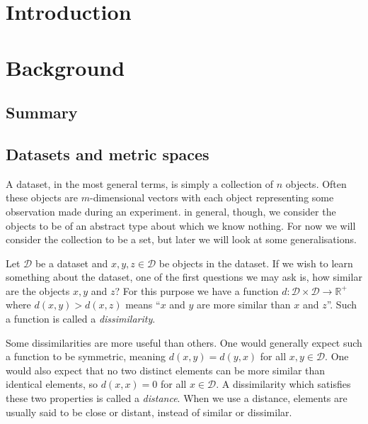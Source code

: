 \documentclass[a4paper]{report}
\title{\reporttitle}
\author{\reportauthor}
\newcommand{\dset}{\mathcal{D}}
\begin{document}
\maketitle

\tableofcontents

\chapter{Introduction}
\label{cha:introduction}

\chapter{Background}
\label{cha:background}

\section{Summary}
\label{sec:summary-backgd}


\section{Datasets and metric spaces}
\label{sec:datas-metr-spac}

A dataset, in the most general terms, is simply a collection of $n$ objects.
Often these objects are $m$-dimensional vectors with each object representing
some observation made during an experiment.  in general, though, we consider
the objects to be of an abstract type about which we know nothing.  For now we
will consider the collection to be a set, but later we will look at some
generalisations.

Let $\dset$ be a dataset and $x,y,z \in \dset$ be objects in the dataset.  If
we wish to learn something about the dataset, one of the first questions we
may ask is, how similar are the objects $x,y$ and $z$?  For this purpose we
have a function $d \colon \dset \times \dset \to \mathbb{R}^+$ where
$d(x,y)>d(x,z)$ means ``$x$ and $y$ are more similar than $x$ and $z$''.  Such
a function is called a \textit{dissimilarity}.

Some dissimilarities are more useful than others.  One would generally expect
such a function to be symmetric, meaning $d(x,y)=d(y,x)$ for all $x,y \in
\dset$.  One would also expect that no two distinct elements can be more
similar than identical elements, so $d(x,x)=0$ for all $x \in \dset$.  A
dissimilarity which satisfies these two properties is called a
\textit{distance}.  When we use a distance, elements are usually said to be
close or distant, instead of similar or dissimilar.
\end{document}
